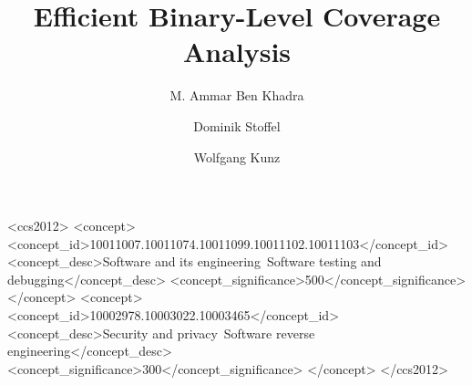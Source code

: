 \documentclass[sigconf,screen]{acmart}
\begin{document}

\date{}

\title{Efficient Binary-Level Coverage Analysis}

\author{M. Ammar Ben Khadra}

\author{Dominik Stoffel}

\author{Wolfgang Kunz}





\begin{CCSXML}
    <ccs2012>
    <concept>
    <concept_id>10011007.10011074.10011099.10011102.10011103</concept_id>
    <concept_desc>Software and its engineering~Software testing and debugging</concept_desc>
    <concept_significance>500</concept_significance>
    </concept>
    <concept>
    <concept_id>10002978.10003022.10003465</concept_id>
    <concept_desc>Security and privacy~Software reverse engineering</concept_desc>
    <concept_significance>300</concept_significance>
    </concept>
    </ccs2012>
\end{CCSXML}


\end{document}
